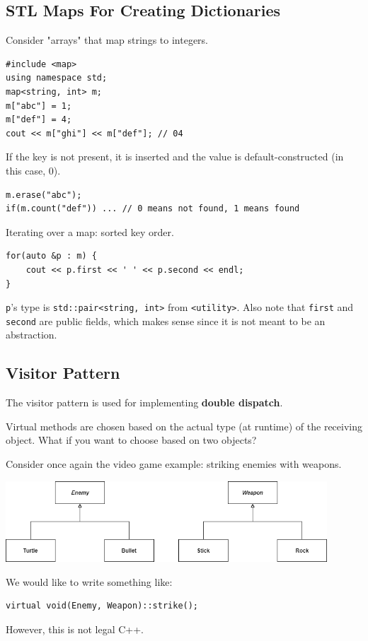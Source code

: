 \documentclass[11pt]{article}
\theoremstyle{definition}
\begin{document}
\subsection{STL Maps For Creating Dictionaries}
Consider "arrays" that map strings to integers.
\begin{lstlisting}
#include <map>
using namespace std;
map<string, int> m;
m["abc"] = 1;
m["def"] = 4;
cout << m["ghi"] << m["def"]; // 04
\end{lstlisting}
\vspace{-0.25cm}
If the key is not present, it is inserted and the value is default-constructed (in this case, 0).
\begin{lstlisting}
m.erase("abc");
if(m.count("def")) ... // 0 means not found, 1 means found
\end{lstlisting}
\vspace{-0.25cm}
Iterating over a map: sorted key order. 
\begin{lstlisting}
for(auto &p : m) {
    cout << p.first << ' ' << p.second << endl;
}
\end{lstlisting}
\vspace{-0.25cm}
{\tt p}'s type is {\tt std::pair<string, int>} from {\tt <utility>}. Also note that {\tt first} and {\tt second} are public fields, which makes sense since it is not meant to be an abstraction.

\subsection{Visitor Pattern}
The visitor pattern is used for implementing {\bf double dispatch}. 

Virtual methods are chosen based on the actual type (at runtime) of the receiving object. What if you want to choose based on two objects?

Consider once again the video game example: striking enemies with weapons.
\begin{center}
\includegraphics[width=0.9\textwidth]{images/game2.png}
\end{center}
We would like to write something like:
\begin{lstlisting}
virtual void(Enemy, Weapon)::strike();
\end{lstlisting}
\vspace{-0.25cm}
However, this is not legal C++.
\end{document}
